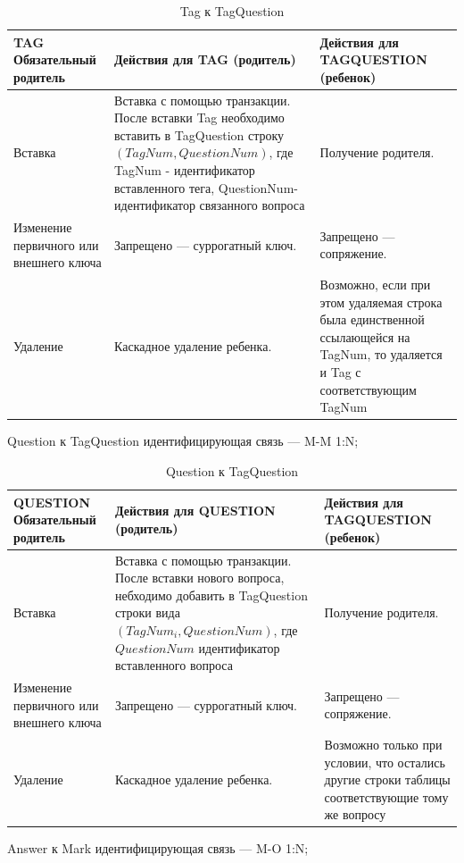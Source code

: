 \documentclass[a4paper, 14pt]{extarticle}
\begin{document}
\begin{table}[H]
\centering
\caption{Tag к TagQuestion}
\begin{tabular}{|>{\centering\arraybackslash}m{4cm}|>{\RaggedRight}m{6cm}|>{\RaggedRight}m{6cm}|}
\hline
\textbf{TAG Обязательный родитель} & \textbf{Действия для TAG (родитель)} & \textbf{Действия для TAGQUESTION (ребенок)} \\
\hline
	Вставка & Вставка с помощью транзакции. После вставки Tag необходимо вставить в TagQuestion строку $(TagNum, QuestionNum)$, где TagNum - идентификатор вставленного тега, QuestionNum- идентификатор связанного вопроса& Получение родителя. \\
\hline
Изменение первичного или внешнего ключа & Запрещено — суррогатный ключ. & Запрещено — сопряжение. \\
\hline
Удаление & Каскадное удаление ребенка. & Возможно, если при этом удаляемая строка была единственной ссылающейся на TagNum, то удаляется и Tag с соответствующим TagNum \\
\hline
\end{tabular}
\end{table}

\pagebreak

Question к TagQuestion идентифицирующая связь — M-M 1:N;

\begin{table}[H]
\centering
\caption{Question к TagQuestion}
\begin{tabular}{|>{\centering\arraybackslash}m{4cm}|>{\RaggedRight}m{6cm}|>{\RaggedRight}m{6cm}|}
\hline
\textbf{QUESTION Обязательный родитель} & \textbf{Действия для QUESTION (родитель)} & \textbf{Действия для TAGQUESTION (ребенок)} \\
\hline
	Вставка & Вставка с помощью транзакции. После вставки нового вопроса, небходимо добавить в TagQuestion строки вида $(TagNum_i, QuestionNum)$, где $QuestionNum$ идентификатор вставленного вопроса & Получение родителя. \\
\hline
Изменение первичного или внешнего ключа & Запрещено — суррогатный ключ. & Запрещено — сопряжение. \\
\hline
Удаление & Каскадное удаление ребенка. & Возможно только при условии, что остались другие строки таблицы соответствующие тому же вопросу\\
\hline
\end{tabular}
\end{table}

\newpage

Answer к Mark идентифицирующая связь — M-O 1:N;
\end{document}

